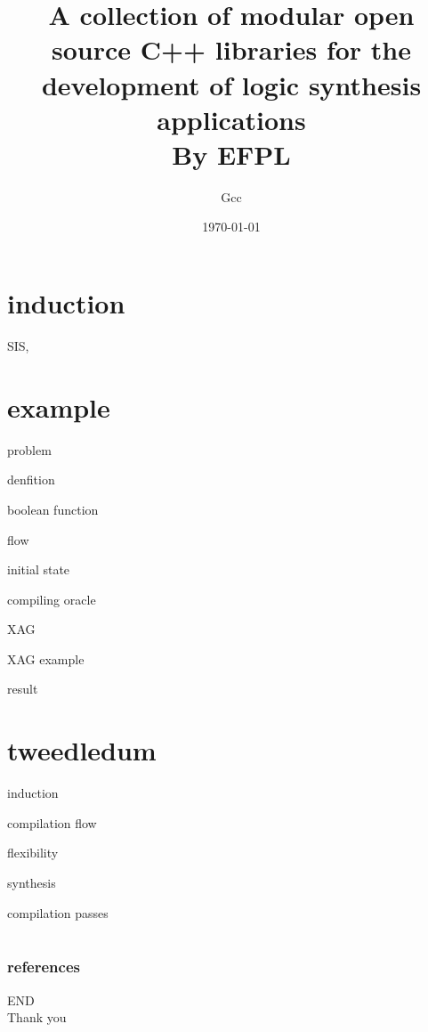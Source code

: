 \documentclass[aspectratio=1610]{beamer}
\title{A collection of modular open source C++ libraries for the development of logic synthesis applications\\ By EFPL}
\author{Gcc}
\date\today
\begin{document}
\begin{frame}[plain]
  \titlepage
\end{frame}
\section{induction}
\begin{frame}
  SIS, 
\end{frame}

\section{example}
\begin{frame}{problem}
\end{frame}
\begin{frame}{denfition}
  
\end{frame}
\begin{frame}{boolean function}

\end{frame}
\begin{frame}{flow}

\end{frame}
\begin{frame}{initial state}
  
\end{frame}
\begin{frame}{compiling oracle}
  
\end{frame}
\begin{frame}{XAG}
  
\end{frame}
\begin{frame}{XAG example}
  
\end{frame}
\begin{frame}{result}
  
\end{frame}

\section{tweedledum}
\begin{frame}{induction}  

\end{frame}
\begin{frame}{compilation flow}
  
\end{frame}
\begin{frame}{flexibility}
  
\end{frame}
\begin{frame}{synthesis}
  
\end{frame}
\begin{frame}{compilation passes}
  
\end{frame}
\section*{}
\begin{frame}
	\frametitle{references}
	\printbibliography
\end{frame}
\begin{frame}
\centering
\Huge{END\\Thank you}
\end{frame}
\end{document}
